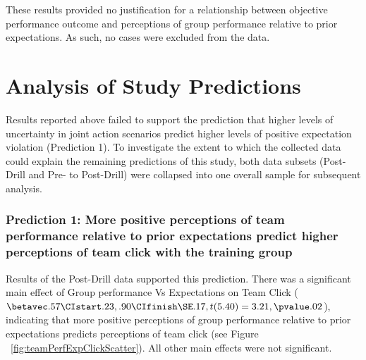 These results provided no justification for a relationship between objective performance outcome and perceptions of group performance relative to prior expectations.  As such, no cases were excluded from the data.

\section{Analysis of Study Predictions\label{sect:resultsStudyPredictions}}




Results reported above failed to support the prediction that higher levels of uncertainty in joint action scenarios predict higher levels of positive expectation violation (Prediction 1).  To investigate the extent to which the collected data could explain the remaining predictions of this study, both data subsets (Post-Drill and Pre- to Post-Drill) were collapsed into one overall sample for subsequent analysis.



\subsubsection{Prediction 1: More positive perceptions of team performance relative to prior expectations predict higher perceptions of team click with the training group}

Results of the Post-Drill data supported this prediction. There was a significant main effect of Group performance Vs Expectations on Team Click ($\betavec .57 \CIstart .23, .90 \CIfinish \SE .17, t(5.40) = 3.21, \pvalue .02$), indicating that more positive perceptions of group performance relative to prior expectations predicts perceptions of team click (see Figure ~\ref{fig:teamPerfExpClickScatter}).  All other main effects were not significant.


